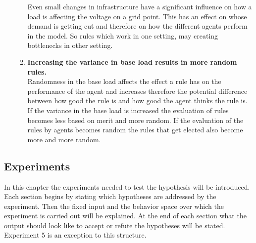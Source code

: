 \documentclass[a4paper]{article}
\begin{document}
\begin{enumerate}
\begin{enumerate}
                                      Even small changes in infrastructure have a significant influence on how
                                      a load is affecting the voltage on a grid point. This has an effect on
                                      whose demand is getting cut and therefore on how the different agents 
                                      perform in the model. So rules which work in one setting, may creating 
                                      bottlenecks in other setting.
                                      \item \textbf{Increasing the variance in base load results in more random rules.} \\
                                      Randomness in the base load affects the effect a rule has on the performance 
                                      of the agent and increases therefore the potential difference between how good
                                      the rule is and how good the agent thinks the rule is. If the variance in
                                      the base load is increased the evaluation of rules becomes less based on
                                      merit and more random. If the evaluation of the rules by agents becomes 
                                      random the rules that get elected also become more and more random.
                                     \end{enumerate}
\end{enumerate}

\subsection{Experiments}
In this chapter the experiments needed to test the hypothesis will be introduced. Each section begins by stating
which hypotheses are addressed by the experiment. Then the fixed input and the behavior space over which the
experiment is carried out will be explained. At the end of each section what the output should look like to
accept or refute the hypotheses will be stated. Experiment  5 is an exception to this structure.
\end{document}
